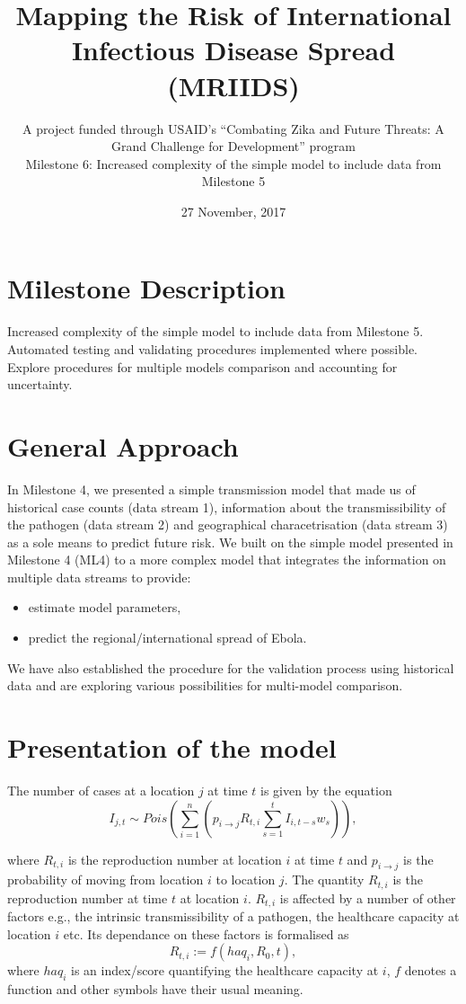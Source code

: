 \documentclass[11pt,]{article}
\title{Mapping the Risk of International Infectious Disease Spread
    (MRIIDS)}
\subtitle{A project funded through USAID’s ``Combating Zika and
    Future Threats: A Grand Challenge for Development'' program \\
    Milestone 6: Increased complexity of the simple model to include data from Milestone 5}
\author{}
\date{27 November, 2017}
\begin{document}
\maketitle
\tableofcontents

\newpage
\section{Milestone Description}\label{milestone-description}

Increased complexity of the simple model to include data from Milestone
5. Automated testing and validating procedures implemented where
possible. Explore procedures for multiple models comparison and accounting for
uncertainty.

\section{General Approach}
In Milestone 4, we presented a simple transmission model that made us of
historical case counts (data stream 1), information about the
transmissibility of the pathogen (data stream 2) and geographical
characetrisation (data stream 3) as a sole means to predict future risk. 
We built on the simple model presented in Milestone 4 (ML4) to a more
complex model that integrates the information on multiple data streams to provide:

\begin{itemize}
\item estimate model parameters,
\item predict the regional/international spread of Ebola. 
\end{itemize}

We have also established the procedure for the validation process
using historical data and are exploring various possibilities for multi-model comparison.

\section{Presentation of the model}\label{sec:model}

The number of cases at a location \(j\) at time \(t\) is given by the equation
\[
  I_{j, t} \sim Pois\left( \sum_{i = 1}^{n} {\left( p_{i \rightarrow j}
  R_{t, i} \sum_{s = 1}^{t}{I_{i, t - s} w_{s}}\right)} \right),
\]

where \(R_{t, i}\) is the reproduction number at location \(i\) at time
\(t\) and \(p_{i \rightarrow j}\) is the probability of moving from
location \(i\) to location \(j\). The quantity $R_{t, i}$ is the
reproduction number at time $t$ at location $i$. $R_{t, i}$ is
affected by a number of other factors e.g., the intrinsic
transmissibility of a pathogen, the healthcare capacity at location
$i$ etc. Its dependance on these factors is formalised as
\[ R_{t, i} := f(haq_i, R_0, t),\]
where $haq_i$ is an index/score quantifying the healthcare capacity at
$i$, $f$ denotes a function and other symbols have their usual meaning.
\end{document}
